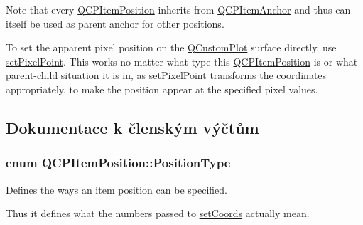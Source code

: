 Note that every \hyperlink{classQCPItemPosition}{Q\+C\+P\+Item\+Position} inherits from \hyperlink{classQCPItemAnchor}{Q\+C\+P\+Item\+Anchor} and thus can itself be used as parent anchor for other positions.

To set the apparent pixel position on the \hyperlink{classQCustomPlot}{Q\+Custom\+Plot} surface directly, use \hyperlink{classQCPItemPosition_ab404e56d9ac2ac2df0382c57933a71ef}{set\+Pixel\+Point}. This works no matter what type this \hyperlink{classQCPItemPosition}{Q\+C\+P\+Item\+Position} is or what parent-\/child situation it is in, as \hyperlink{classQCPItemPosition_ab404e56d9ac2ac2df0382c57933a71ef}{set\+Pixel\+Point} transforms the coordinates appropriately, to make the position appear at the specified pixel values. 

\subsection{Dokumentace k členským výčtům}
\hypertarget{classQCPItemPosition_aad9936c22bf43e3d358552f6e86dbdc8}{}
\subsubsection[{Position\+Type}]{\setlength{\rightskip}{0pt plus 5cm}enum {\bf Q\+C\+P\+Item\+Position\+::\+Position\+Type}}\label{classQCPItemPosition_aad9936c22bf43e3d358552f6e86dbdc8}


Defines the ways an item position can be specified. 

Thus it defines what the numbers passed to \hyperlink{classQCPItemPosition_aa988ba4e87ab684c9021017dcaba945f}{set\+Coords} actually mean.

